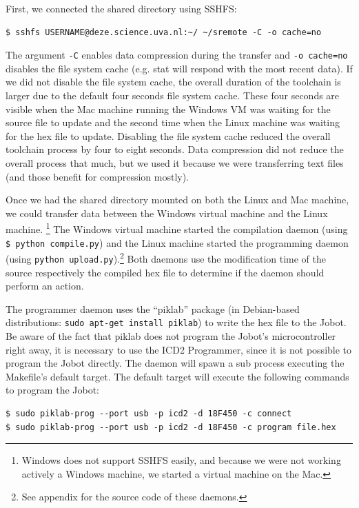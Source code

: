 \documentclass[a4paper,10pt]{article} %
\begin{document}
\noindent First, we connected the shared directory using SSHFS:

\begin{verbatim}
$ sshfs USERNAME@deze.science.uva.nl:~/ ~/sremote -C -o cache=no
\end{verbatim}

The argument \texttt{-C} enables data compression during the transfer and
\texttt{-o cache=no} disables the file system cache (e.g. stat will respond with
the most recent data). If we did not disable the file system cache, the overall
duration of the toolchain is larger due to the default four seconds file system
cache. These four seconds are visible when the Mac machine running the Windows
VM was waiting for the source file to update and the second time when the Linux
machine was waiting for the hex file to update. Disabling the file system cache
reduced the overall toolchain process by four to eight seconds. Data compression
did not reduce the overall process that much, but we used it because we were
transferring text files (and those benefit for compression mostly).

Once we had the shared directory mounted on both the Linux and Mac machine, we
could transfer data between the Windows virtual machine and the Linux machine.
\footnote{Windows does not support SSHFS easily, and because we were not
working
actively a Windows machine, we started a virtual machine on the Mac.} The
Windows virtual machine started the compilation daemon (using \texttt{\$ python
compile.py}) and the Linux machine started the programming daemon (using
\texttt{python upload.py}).\footnote{See appendix for the source code of these
daemons.} Both daemons use the modification time of the source respectively the
compiled hex file to determine if the daemon should perform an action.

The programmer daemon uses the ``piklab'' package (in Debian-based
distributions: \texttt{sudo apt-get install piklab}) to write the hex file to
the Jobot. Be aware of the fact that piklab does not program the Jobot's
microcontroller right away, it is necessary to use the ICD2 Programmer, since
it is not possible to program the Jobot directly. The daemon will spawn a
sub process executing the Makefile's default target. The default target will
execute the following commands to program the Jobot:

\begin{verbatim}
$ sudo piklab-prog --port usb -p icd2 -d 18F450 -c connect
$ sudo piklab-prog --port usb -p icd2 -d 18F450 -c program file.hex
\end{verbatim}
\end{document}
